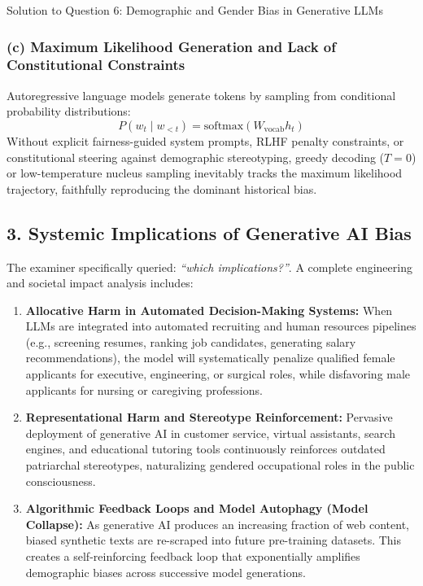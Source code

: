 \documentclass[11pt,a4paper]{article}
\begin{document}
\begin{solutionbox}{Solution to Question 6: Demographic and Gender Bias in Generative LLMs}
\subsubsection*{(c) Maximum Likelihood Generation and Lack of Constitutional Constraints}
Autoregressive language models generate tokens by sampling from conditional probability distributions:
\begin{equation}
    P(w_t \mid w_{<t}) = \text{softmax}(W_{\text{vocab}} h_t)
\end{equation}
Without explicit fairness-guided system prompts, RLHF penalty constraints, or constitutional steering against demographic stereotyping, greedy decoding ($T = 0$) or low-temperature nucleus sampling inevitably tracks the maximum likelihood trajectory, faithfully reproducing the dominant historical bias.

\subsection*{3. Systemic Implications of Generative AI Bias}
The examiner specifically queried: \textit{``which implications?''}. A complete engineering and societal impact analysis includes:

\begin{enumerate}[label=\textbf{(\alph*)},leftmargin=1.5em,itemsep=3pt]
    \item \textbf{Allocative Harm in Automated Decision-Making Systems:}
    When LLMs are integrated into automated recruiting and human resources pipelines (e.g., screening resumes, ranking job candidates, generating salary recommendations), the model will systematically penalize qualified female applicants for executive, engineering, or surgical roles, while disfavoring male applicants for nursing or caregiving professions.
    
    \item \textbf{Representational Harm and Stereotype Reinforcement:}
    Pervasive deployment of generative AI in customer service, virtual assistants, search engines, and educational tutoring tools continuously reinforces outdated patriarchal stereotypes, naturalizing gendered occupational roles in the public consciousness.
    
    \item \textbf{Algorithmic Feedback Loops and Model Autophagy (Model Collapse):}
    As generative AI produces an increasing fraction of web content, biased synthetic texts are re-scraped into future pre-training datasets. This creates a self-reinforcing feedback loop that exponentially amplifies demographic biases across successive model generations.
    

\end{enumerate}
\end{solutionbox}
\end{document}
